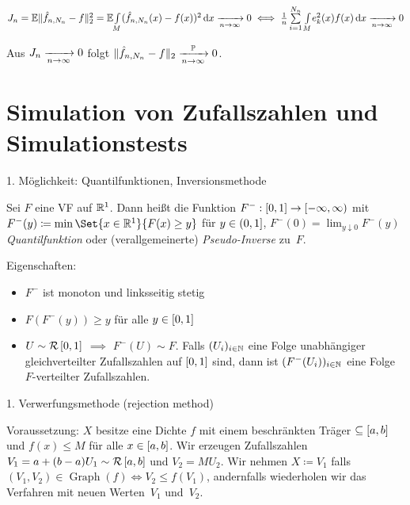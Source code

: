 \documentclass{cheat-sheet}
\renewcommand{\P}{\mathbb{P}} %
\newcommand{\E}{\mathbb{E}} %
\newcommand{\Uniform}{\mathcal{R}} %
\DeclareMathOperator{\Graph}{Graph} %
\begin{document}

\begin{satz}
  $J_n = \E \norm{\hat{f}_{n,N_n} - f}_2^2 = \E \AInt{M}{(\hat{f}_{n,N_n}(x) - f(x))^2}{x} \xra[n \to \infty]{} 0 \iff \tfrac{1}{n} \sum_{i=1}^{N_n} \AInt{M}{e_k^2(x) f(x)}{x} \xra[n \to \infty]{} 0$
\end{satz}

\begin{kor}
  Aus $J_n \xrightarrow[n \to \infty]{} 0$ folgt $\norm{\hat{f}_{n,N_n} - f}_2 \xra[n \to \infty]{\P} 0$.
\end{kor}

\section{Simulation von Zufallszahlen und Simulationstests}


1. Möglichkeit: Quantilfunktionen, Inversionsmethode

Sei $F$ eine VF auf $\mathbb{R}^1$.
Dann heißt die Funktion $F^{-} : \left[ 0, 1 \right] \to \left[ -\infty, \infty \right)$ mit $F^{-}(y) \coloneqq \min \Set{x \in \R^1}{F(x) \geq y}$ für $y \in \left( 0, 1 \right]$, $F^{-}(0) = \lim_{y \downarrow 0} F^{-}(y)$ \emph{Quantilfunktion} oder (verallgemeinerte) \emph{Pseudo-Inverse} zu~$F$.

Eigenschaften:

\begin{itemize}
  \item $F^{-}$ ist monoton und linksseitig stetig
  \item $F(F^{-}(y)) \geq y$ für alle $y \in \left[ 0, 1 \right]$
  \item $U \sim \Uniform \cinterval{0}{1}$ $\implies$ $F^{-}(U) \sim F$.
  Falls $(U_i)_{i \in \mathbb{N}}$ eine Folge unabhängiger gleichverteilter Zufallszahlen auf $\left[ 0, 1 \right]$ sind, dann ist $(F^{-}(U_i))_{i \in \mathbb{N}}$ eine Folge $F$-verteilter Zufallszahlen.
\end{itemize}



1. Verwerfungsmethode (rejection method)

Voraussetzung: $X$ besitze eine Dichte $f$ mit einem beschränkten Träger $\subseteq \left[ a, b \right]$ und $f(x) \leq M$ für alle $x \in \left[ a, b \right]$.
Wir erzeugen Zufallszahlen $V_1 = a + (b-a) U_1 \sim \Uniform \cinterval{a}{b}$ und $V_2 = M U_2$.
Wir nehmen $X \coloneqq V_1$ falls $(V_1, V_2) \in \Graph(f) \iff V_2 \leq f(V_1)$, andernfalls wiederholen wir das Verfahren mit neuen Werten~$V_1$ und~$V_2$.
\end{document}
